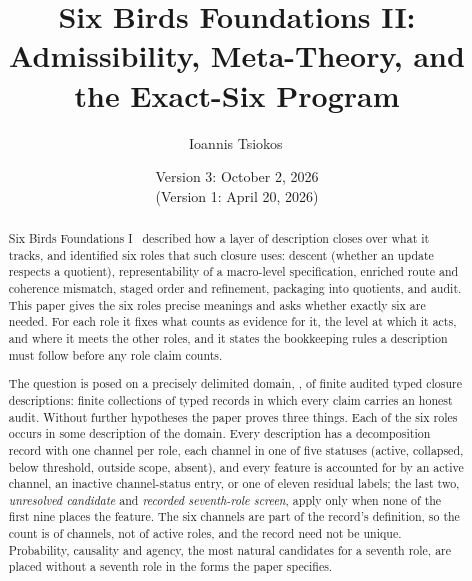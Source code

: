 \title{Six Birds Foundations II:\\[4pt]
Admissibility, Meta-Theory, and the Exact-Six Program}
\author{Ioannis Tsiokos\,}
\date{Version 3: October 2, 2026\\[2pt] \footnotesize (Version 1: April 20, 2026)}

\maketitle
\thispagestyle{firstpage}

\begin{abstract}
\noindent
Six Birds Foundations I~\citep{Tsiokos2026SixBirdsFoundations}
described how a layer of description closes over what it tracks, and
identified six roles that such closure uses: descent (whether an update
respects a quotient), representability of a macro-level specification,
enriched route and coherence mismatch, staged order and refinement, packaging into
quotients, and audit. This paper gives the six roles precise meanings
and asks whether exactly six are needed. For each role it fixes what
counts as evidence for it, the level at which it acts, and where it
meets the other roles, and it states the bookkeeping rules a
description must follow before any role claim counts.

The question is posed on a precisely delimited domain, \FATCD{}, of finite
audited typed closure descriptions: finite collections of typed records in
which every claim carries an honest audit. Without further hypotheses the paper
proves three things. Each of the six roles occurs in some description of the
domain. Every description has a decomposition record with one channel per role,
each channel in one of five statuses (active, collapsed, below threshold,
outside scope, absent), and every feature is accounted for by an active
channel, an inactive channel-status entry, or one of eleven residual labels;
the last two, \emph{unresolved candidate} and \emph{recorded seventh-role
screen}, apply only when none of the first nine places the feature. The six channels are part of the record's definition, so the
count is of channels, not of active roles, and the record need not be unique.
Probability, causality and agency, the most natural candidates for a seventh
role, are placed without a seventh role in the forms the paper specifies.


\end{abstract}
